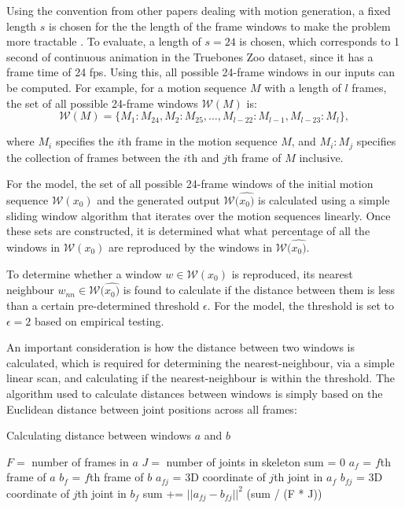\documentclass[a4paper, 12pt]{report}
\begin{document}
Using the convention from other papers dealing with motion generation, a fixed length \(s\) is chosen for the the length of the frame windows to make the problem more tractable \cite{li_ganimator_2022}. To evaluate, a length of \(s=24\) is chosen, which corresponds to 1 second of continuous animation in the Truebones Zoo dataset, since it has a frame time of 24 fps. Using this, all possible 24-frame windows in our inputs can be computed. For example, for a motion sequence \(M\) with a length of \(l\) frames, the set of all possible 24-frame windows \(\mathcal{W}(M)\) is:  
\begin{equation}
	\mathcal{W}(M) = \{ M_1:M_{24}, M_2:M_{25},\dots, M_{l-22}:M_{l-1}, M_{l-23}:M_l\},
\end{equation}

where \(M_i\) specifies the \(i\)th frame in the motion sequence \(M\), and \(M_i:M_j\) specifies the collection of frames between the \(i\)th and \(j\)th frame of \(M\) inclusive.

For the model, the set of all possible 24-frame windows of the initial motion sequence \(\mathcal{W}(x_0)\) and the generated output \(\mathcal{W}(\hat{x_0)}\) is calculated using a simple sliding window algorithm that iterates over the motion sequences linearly. Once these sets are constructed, it is determined what what percentage of all the windows in \(\mathcal{W}(x_0)\) are reproduced by the windows in \(\mathcal{W}(\hat{x_0)}\). 

To determine whether a window \(w \in \mathcal{W}(x_0)\) is reproduced, its nearest neighbour \(w_{nn} \in \mathcal{W}(\hat{x_0)}\) is found to calculate if the distance between them is less than a certain pre-determined threshold \(\epsilon\). For the model, the threshold is set to \(\epsilon=2\) based on empirical testing.

An important consideration is how the distance between two windows is calculated, which is required for determining the nearest-neighbour, via a simple linear scan, and calculating if the nearest-neighbour is within the threshold. The algorithm used to calculate distances between windows is simply based on the Euclidean distance between joint positions across all frames:

\begin{algorithm}[H]
	\caption{Calculating distance between windows \(a\) and \(b\)} \label{distance-metric}
	\begin{algorithmic}[1]
		\State \(F = \) number of frames in \(a\)
		\State \(J = \) number of joints in skeleton
		\State sum = 0
		\State \(a_f\) = \(f\)th frame of \(a\)
		\State \(b_f\) = \(f\)th frame of \(b\)
		\State \(a_{fj}\) = 3D coordinate of \(j\)th joint in \(a_f\)
		\State \(b_{fj}\) = 3D coordinate of \(j\)th joint in \(b_f\)
		\State sum += \({||a_{fj} - b_{fj}||}^2\)
		\EndFor
		\EndFor
		\State \Return (sum / (F * J))
	\end{algorithmic}
\end{algorithm}
\end{document}
